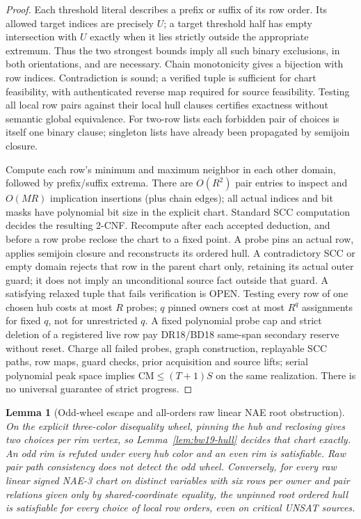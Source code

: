 \documentclass[11pt]{article}
\newtheorem{lemma}[theorem]{Lemma}
\begin{document}
\begin{proof}
Each threshold literal describes a prefix or suffix of its row order. Its allowed target indices are precisely $U$; a target threshold half has empty intersection with $U$ exactly when it lies strictly outside the appropriate extremum. Thus the two strongest bounds imply all such binary exclusions, in both orientations, and are necessary. Chain monotonicity gives a bijection with row indices. Contradiction is sound; a verified tuple is sufficient for chart feasibility, with authenticated reverse map required for source feasibility. Testing all local row pairs against their local hull clauses certifies exactness without semantic global equivalence. For two-row lists each forbidden pair of choices is itself one binary clause; singleton lists have already been propagated by semijoin closure.

Compute each row's minimum and maximum neighbor in each other domain, followed by prefix/suffix extrema. There are $O(R^2)$ pair entries to inspect and $O(MR)$ implication insertions (plus chain edges); all actual indices and bit masks have polynomial bit size in the explicit chart. Standard SCC computation decides the resulting 2-CNF. Recompute after each accepted deduction, and before a row probe reclose the chart to a fixed point. A probe pins an actual row, applies semijoin closure and reconstructs its ordered hull. A contradictory SCC or empty domain rejects that row in the parent chart only, retaining its actual outer guard; it does not imply an unconditional source fact outside that guard. A satisfying relaxed tuple that fails verification is OPEN. Testing every row of one chosen hub costs at most $R$ probes; $q$ pinned owners cost at most $R^q$ assignments for fixed $q$, not for unrestricted $q$. A fixed polynomial probe cap and strict deletion of a registered live row pay DR18/BD18 same-span secondary reserve without reset. Charge all failed probes, graph construction, replayable SCC paths, row maps, guard checks, prior acquisition and source lifts; serial polynomial peak space implies $\mathrm{CM}\le(T+1)S$ on the same realization. There is no universal guarantee of strict progress.
\end{proof}
\begin{lemma}[Odd-wheel escape and all-orders raw linear NAE root obstruction]\label{lem:bw19-wheel}
On the explicit three-color disequality wheel, pinning the hub and reclosing gives two choices per rim vertex, so Lemma~\ref{lem:bw19-hull} decides that chart exactly. An odd rim is refuted under every hub color and an even rim is satisfiable. Raw pair path consistency does not detect the odd wheel. Conversely, for every raw linear signed NAE-3 chart on distinct variables with six rows per owner and pair relations given only by shared-coordinate equality, the unpinned root ordered hull is satisfiable for \emph{every} choice of local row orders, even on critical UNSAT sources.
\end{lemma}
\end{document}
